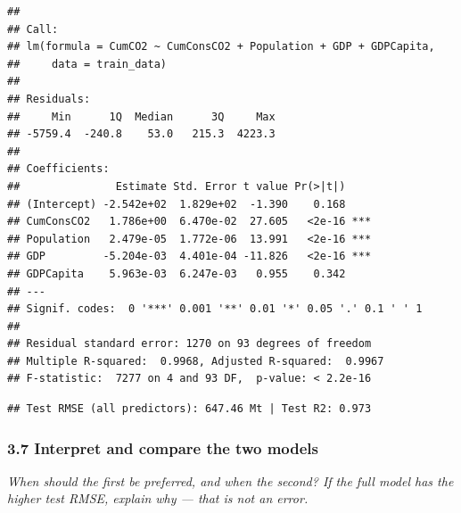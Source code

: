 \documentclass[
]{article}
\newenvironment{Shaded}{\begin{snugshade}}{\end{snugshade}}
\newcommand{\AttributeTok}[1]{\textcolor[rgb]{0.13,0.29,0.53}{#1}}
\newcommand{\DecValTok}[1]{\textcolor[rgb]{0.00,0.00,0.81}{#1}}
\newcommand{\FunctionTok}[1]{\textcolor[rgb]{0.13,0.29,0.53}{\textbf{#1}}}
\newcommand{\NormalTok}[1]{#1}
\newcommand{\OtherTok}[1]{\textcolor[rgb]{0.56,0.35,0.01}{#1}}
\newcommand{\SpecialCharTok}[1]{\textcolor[rgb]{0.81,0.36,0.00}{\textbf{#1}}}
\newcommand{\StringTok}[1]{\textcolor[rgb]{0.31,0.60,0.02}{#1}}
\begin{document}
\begin{verbatim}
## 
## Call:
## lm(formula = CumCO2 ~ CumConsCO2 + Population + GDP + GDPCapita, 
##     data = train_data)
## 
## Residuals:
##     Min      1Q  Median      3Q     Max 
## -5759.4  -240.8    53.0   215.3  4223.3 
## 
## Coefficients:
##               Estimate Std. Error t value Pr(>|t|)    
## (Intercept) -2.542e+02  1.829e+02  -1.390    0.168    
## CumConsCO2   1.786e+00  6.470e-02  27.605   <2e-16 ***
## Population   2.479e-05  1.772e-06  13.991   <2e-16 ***
## GDP         -5.204e-03  4.401e-04 -11.826   <2e-16 ***
## GDPCapita    5.963e-03  6.247e-03   0.955    0.342    
## ---
## Signif. codes:  0 '***' 0.001 '**' 0.01 '*' 0.05 '.' 0.1 ' ' 1
## 
## Residual standard error: 1270 on 93 degrees of freedom
## Multiple R-squared:  0.9968, Adjusted R-squared:  0.9967 
## F-statistic:  7277 on 4 and 93 DF,  p-value: < 2.2e-16
\end{verbatim}

\begin{Shaded}
\end{Shaded}

\begin{verbatim}
## Test RMSE (all predictors): 647.46 Mt | Test R2: 0.973
\end{verbatim}

\subsubsection{3.7 Interpret and compare the two
models}\label{interpret-and-compare-the-two-models}

\emph{When should the first be preferred, and when the second? If the
full model has the higher test RMSE, explain why --- that is not an
error.}
\end{document}
